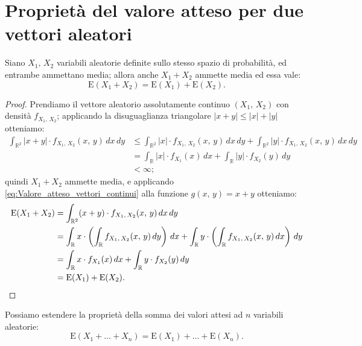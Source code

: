     \section{Proprietà del valore atteso per due vettori aleatori}
    \begin{prty}
            Siano $X_1,\,X_2$ variabili aleatorie definite sullo stesso spazio di probabilità, ed entrambe ammettano media; allora anche $X_1 + X_2$ ammette media ed essa vale: \[
            \text{E}(X_1 + X_2) = \text{E}(X_1) + \text{E}(X_2)
            .\]
        \end{prty}
        \begin{proof}
            Prendiamo il vettore aleatorio assolutamente continuo $(X_1,\,X_2)$ con densità $f_{X_1,\,X_2}$; 
            applicando la disuguaglianza triangolare $|x+y| \leq |x| + |y|$ otteniamo:
            \begin{align*}
                \int_{\mathbb{R}^2} |x+y| \cdot f_{X_1,\,X_2}(x,\,y)\, dx\,dy &\leq 
                \int_{\mathbb{R}^2} |x| \cdot f_{X_1,\,X_2}(x,\,y)\, dx\,dy + 
                \int_{\mathbb{R}^2} |y| \cdot f_{X_1,\,X_2}(x,\,y)\, dx\,dy \\
                &= \int_{\mathbb{R}} |x|\cdot f_{X_1}(x)\, dx + \int_{\mathbb{R}} |y|\cdot f_{X_2}(y)\, dy \\
                &< \infty
            ;\end{align*}
            quindi $X_1 + X_2$ ammette media, e applicando \eqref{eq:Valore_atteso_vettori_continui} alla 
            funzione $g(x,\,y) = x+y$ otteniamo:
            \begin{align*}
                \text{E}(X_1 + X_2) &= \int_{\mathbb{R}^2} (x+y)\cdot f_{X_1,\,X_2}(x,\,y)\, dx\, dy \\
                &= \int_{\mathbb{R}} x\cdot \left(\int_{\mathbb{R}}f_{X_1,\,X_2}(x,\,y)\, dy\right)\, dx + \int_{\mathbb{R}} y\cdot \left(\int_{\mathbb{R}}f_{X_1,\,X_2}(x,\,y)\, dx\right)\, dy \\
                &= \int_{\mathbb{R}} x\cdot f_{X_1}(x)\, dx + \int_{\mathbb{R}} y\cdot f_{X_2}(y)\, dy \\
                &= \text{E}(X_1) + \text{E}(X_2) \qedhere
            .\end{align*}
        \end{proof}
        \begin{obsv}
            Possiamo estendere la proprietà della somma dei valori attesi ad $n$ variabili aleatorie: \[
            \text{E}(X_1+\ldots+X_n) = \text{E}(X_1)+\ldots+\text{E}(X_n)
            .\] 
        \end{obsv}
